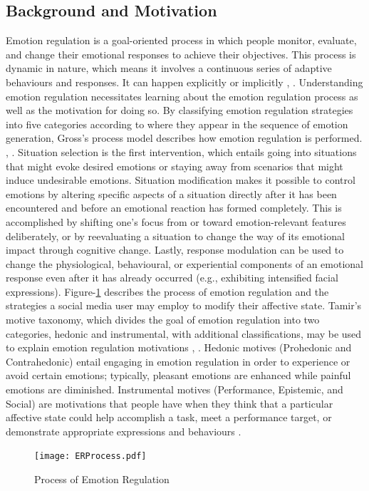 \subsection{Background and Motivation}
Emotion regulation is a goal-oriented process in which people monitor, evaluate, and change their emotional responses to achieve their objectives. This process is dynamic in nature, which means it involves a continuous series of adaptive behaviours and responses. It can happen explicitly or implicitly \cite{braunstein2017explicit}, \cite{gyurak2011explicit}.
Understanding emotion regulation necessitates learning about the emotion regulation process as well as the motivation for doing so. By classifying emotion regulation strategies into five categories according to where they appear in the sequence of emotion generation, Gross's process model describes how emotion regulation is performed. \cite{wadley2020digital}, \cite{gross1998emerging}. Situation selection is the first intervention, which entails going into situations that might evoke desired emotions or staying away from scenarios that might induce undesirable emotions. Situation modification makes it possible to control emotions by altering specific aspects of a situation directly after it has been encountered and before an emotional reaction has formed completely. This is accomplished by shifting one's focus from or toward emotion-relevant features deliberately, or by reevaluating a situation to change the way of its emotional impact through cognitive change. Lastly, response modulation can be used to change the physiological, behavioural, or experiential components of an emotional response even after it has already occurred (e.g., exhibiting intensified facial expressions).  Figure-\ref{fig:Process} describes the process of emotion regulation and the strategies a social media user may employ to modify their affective state. Tamir's motive taxonomy, which divides the goal of emotion regulation into two categories, hedonic and instrumental, with additional classifications, may be used to explain emotion regulation motivations \cite{wadley2020digital}, \cite{tamir2016people}. Hedonic motives (Prohedonic and Contrahedonic) entail engaging in emotion regulation in order to experience or avoid certain emotions; typically, pleasant emotions are enhanced while painful emotions are diminished. Instrumental motives (Performance, Epistemic, and Social) are motivations that people have when they think that a particular affective state could help accomplish a task, meet a performance target, or demonstrate appropriate expressions and behaviours \cite{wadley2020digital}.
\begin{figure}[h]
  
    \centering
    \texttt{[image: ERProcess.pdf]}
  \caption{Process of Emotion Regulation}
  \label{fig:Process}
  \end{figure}
  
